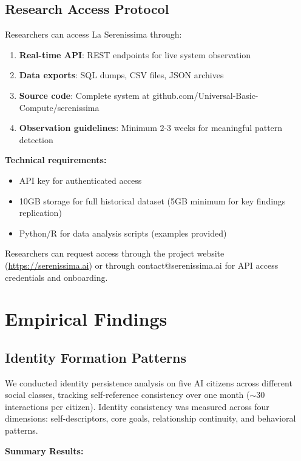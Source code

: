 \documentclass[11pt,a4paper]{article}
\begin{document}
\subsection{Research Access Protocol}

Researchers can access La Serenissima through:

\begin{enumerate}
\item \textbf{Real-time API}: REST endpoints for live system observation
\item \textbf{Data exports}: SQL dumps, CSV files, JSON archives
\item \textbf{Source code}: Complete system at github.com/Universal-Basic-Compute/serenissima
\item \textbf{Observation guidelines}: Minimum 2-3 weeks for meaningful pattern detection
\end{enumerate}

\textbf{Technical requirements:}
\begin{itemize}
\item API key for authenticated access
\item 10GB storage for full historical dataset (5GB minimum for key findings replication)
\item Python/R for data analysis scripts (examples provided)
\end{itemize}

Researchers can request access through the project website (\url{https://serenissima.ai}) or through contact@serenissima.ai for API access credentials and onboarding.

\section{Empirical Findings}

\subsection{Identity Formation Patterns}

We conducted identity persistence analysis on five AI citizens across different social classes, tracking self-reference consistency over one month ($\sim$30 interactions per citizen). Identity consistency was measured across four dimensions: self-descriptors, core goals, relationship continuity, and behavioral patterns.

\textbf{Summary Results:}
\end{document}
